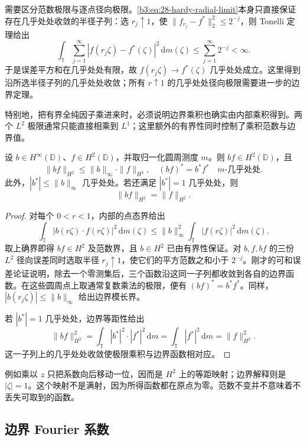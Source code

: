 \ProseParagraphBreak
需要区分范数极限与逐点径向极限。\eqref{b3:eq:28-hardy-radial-limit}本身只直接保证存在几乎处处收敛的半径子列：选 \(r_j\uparrow1\)，使 \(\|f_{r_j}-f^*\|_2^2\le2^{-j}\)，则 Tonelli 定理给出
\[
 \int_{\mathbb T}\sum_{j=1}^{\infty}|f(r_j\zeta)-f^*(\zeta)|^2
 \,\mathrm dm(\zeta)\le\sum_{j=1}^{\infty}2^{-j}<\infty.
\]
于是误差平方和在几乎处处有限，故 \(f(r_j\zeta)\to f^*(\zeta)\) 几乎处处成立。这里得到沿所选半径子列的几乎处处收敛；所有 \(r\uparrow1\) 的几乎处处径向极限需要进一步的边界定理。

\ProseParagraphBreak
特别地，把有界全纯因子乘进来时，必须说明边界乘积也确实由内部乘积得到。两个 \(L^2\) 极限通常只能直接相乘到 \(L^1\)；这里额外的有界性同时控制了乘积范数与边界值。

\begin{proposition}[有界全纯因子的乘法]\label{b3:prop:28-hardy-multiplier}
设 \(b\in H^\infty(\mathbb D)\)、\(f\in H^2(\mathbb D)\)，并取归一化圆周测度 \(m\)。则 \(bf\in H^2(\mathbb D)\)，且
\[
 \|bf\|_{H^2}\le\|b\|_\infty\cdot\|f\|_{H^2},
 \quad (bf)^*=b^*f^*\quad m\text{-几乎处处}.
\]
此外，\(|b^*|\le\|b\|_\infty\) 几乎处处。若还满足 \(|b^*|=1\) 几乎处处，则
\[
 \|bf\|_{H^2}=\|f\|_{H^2}.
\]
\end{proposition}
\begin{proof}
对每个 \(0<r<1\)，内部的点态界给出
\[
 \int_{\mathbb T}|b(r\zeta)\cdot f(r\zeta)|^2\,\mathrm dm(\zeta)
 \le\|b\|_\infty^2
       \int_{\mathbb T}|f(r\zeta)|^2\,\mathrm dm(\zeta).
\]
取上确界即得 \(bf\in H^2\) 及范数界，且 \(b\in H^2\) 已由有界性保证。对 \(b,f,bf\) 的三份 \(L^2\) 径向误差同时选取半径 \(r_j\uparrow1\)，使它们的平方范数之和小于 \(2^{-j}\)。刚才的可和误差论证说明，除去一个零测集后，三个函数沿这同一子列都收敛到各自的边界函数。在这些圆周点上取通常复数乘法的极限，便有 \((bf)^*=b^*f^*\)。同样，\(|b(r_j\zeta)|\le\|b\|_\infty\) 给出边界模长界。

若 \(|b^*|=1\) 几乎处处，边界等距性给出
\[
 \|bf\|_{H^2}^2
 =\int_{\mathbb T}|b^*|^2\cdot|f^*|^2\,\mathrm dm
 =\int_{\mathbb T}|f^*|^2\,\mathrm dm
 =\|f\|_{H^2}^2.
\]
这一子列上的几乎处处收敛使极限乘积与边界函数相对应。
\end{proof}

例如乘以 \(z\) 只把系数向后移动一位，因而是 \(H^2\) 上的等距映射；边界解释则是 \(|\zeta|=1\)。这个映射不是满射，因为所得函数都在原点为零。范数不变并不意味着不丢失可取到的函数。

\subsection{边界 Fourier 系数}
\label{b3:subsec:280202}

